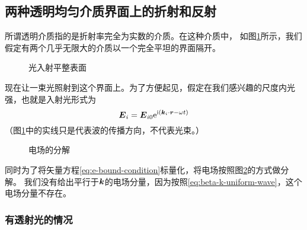 \subsection{两种透明均匀介质界面上的折射和反射}\label{sec:two-isotrophy-surface}

所谓透明介质指的是折射率完全为实数的介质。在这种介质中，
如图\ref{fig:ray-onto-flat-surface}所示，我们假定有两个几乎无限大的介质以一个完全平坦的界面隔开。
\begin{figure}
    \centering
    \caption{光入射平整表面}
    \label{fig:ray-onto-flat-surface}
\end{figure}
现在让一束光照射到这个界面上。为了方便起见，假定在我们感兴趣的尺度内光强，也就是入射光形式为
\[
    \vb*{E}_i = \vb*{E}_{i0} \mathrm{e}^{\mathrm{i}(\vb*{k}_i \cdot \vb*{r} - \omega t)}
\]
（图\ref{fig:ray-onto-flat-surface}中的实线只是代表波的传播方向，不代表光束。）

\begin{figure}
    \centering
    \caption{电场的分解}
    \label{fig:decomposition-of-e}
\end{figure}

同时为了将矢量方程\eqref{eq:e-bound-condition}标量化，将电场按照图\ref{fig:decomposition-of-e}的方式做分解。
我们没有给出平行于$\vb*{k}$的电场分量，因为按照\eqref{eq:beta-k-uniform-wave}，这个电场分量不存在。

\subsubsection{有透射光的情况}

